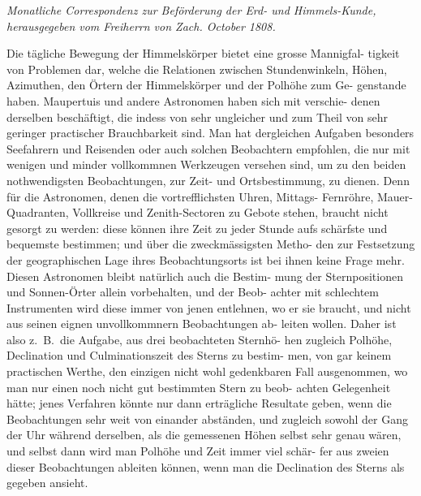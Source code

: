 \documentclass[12pt,a4paper]{article}
\begin{document}

\begin{center}
\textit{Monatliche Correspondenz zur Beförderung der Erd- und Himmels-Kunde,}\\
\textit{herausgegeben vom Freiherrn von Zach. October 1808.}
\end{center}

\vspace{1em}

Die tägliche Bewegung der Himmelskörper bietet eine grosse Mannigfal-
tigkeit von Problemen dar, welche die Relationen zwischen Stundenwinkeln,
Höhen, Azimuthen, den Örtern der Himmelskörper und der Polhöhe zum Ge-
genstande haben. Maupertuis und andere Astronomen haben sich mit verschie-
denen derselben beschäftigt, die indess von sehr ungleicher und zum Theil von
sehr geringer practischer Brauchbarkeit sind. Man hat dergleichen Aufgaben
besonders Seefahrern und Reisenden oder auch solchen Beobachtern empfohlen,
die nur mit wenigen und minder vollkommnen Werkzeugen versehen sind, um
zu den beiden nothwendigsten Beobachtungen, zur Zeit- und Ortsbestimmung,
zu dienen. Denn für die Astronomen, denen die vortrefflichsten Uhren, Mittags-
Fernröhre, Mauer-Quadranten, Vollkreise und Zenith-Sectoren zu Gebote stehen,
braucht nicht gesorgt zu werden: diese können ihre Zeit zu jeder Stunde
aufs schärfste und bequemste bestimmen; und über die zweckmässigsten Metho-
den zur Festsetzung der geographischen Lage ihres Beobachtungsorts ist bei ihnen
keine Frage mehr. Diesen Astronomen bleibt natürlich auch die Bestim-
mung der Sternpositionen und Sonnen-Örter allein vorbehalten, und der Beob-
achter mit schlechtem Instrumenten wird diese immer von jenen entlehnen, wo
er sie braucht, und nicht aus seinen eignen unvollkommnern Beobachtungen ab-
leiten wollen. Daher ist also z.\ B.\ die Aufgabe, aus drei beobachteten Sternhö-
hen zugleich Polhöhe, Declination und Culminationszeit des Sterns zu bestim-
men, von gar keinem practischen Werthe, den einzigen nicht wohl gedenkbaren
Fall ausgenommen, wo man nur einen noch nicht gut bestimmten Stern zu beob-
achten Gelegenheit hätte; jenes Verfahren könnte nur dann erträgliche Resultate
geben, wenn die Beobachtungen sehr weit von einander abständen, und zugleich
sowohl der Gang der Uhr während derselben, als die gemessenen Höhen selbst
sehr genau wären, und selbst dann wird man Polhöhe und Zeit immer viel schär-
fer aus zweien dieser Beobachtungen ableiten können, wenn man die Declination
des Sterns als gegeben ansieht.
\end{document}
